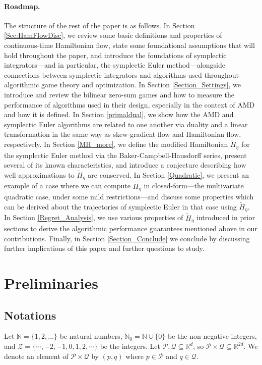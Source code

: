 \documentclass[11pt]{article}
\renewcommand{\P}{\mathcal{P}}
\newcommand{\R}{\mathbb{R}}
\newcommand{\Z}{\mathcal{Z}}
\newcommand{\N}{\mathbb{N}}
\newcommand{\Q}{\mathcal{Q}}
\begin{document}
\paragraph{Roadmap.}
The structure of the rest of the paper is as follows. In Section \ref{Sec:HamFlowDisc}, we review some basic definitions and properties of continuous-time Hamiltonian flow, state some foundational assumptions that will hold throughout the paper, and introduce the foundations of symplectic integrators---and in particular, the symplectic Euler method---alongside connections between symplectic integrators and algorithms used throughout algorithmic game theory and optimization. 
In Section \ref{Section_Settings}, we introduce and review the bilinear zero-sum games and how to measure the performance of algorithms used in their design, especially in the context of AMD and how it is defined. 
In Section \ref{primaldual}, we show how the AMD and symplectic Euler algorithms are related to one another via duality and a linear transformation in the same way as skew-gradient flow and Hamiltonian flow, respectively.  
In Section \ref{MH_more}, we define the modified Hamiltonian $\widetilde{H}_{\eta}$ for the symplectic Euler method via the Baker-Campbell-Hausdorff series, present several of its known characteristics, and introduce a conjecture describing how well approximations to $\widetilde{H}_{\eta}$ are conserved.
In Section \ref{Quadratic}, we present an example of a case where we can compute $\widetilde{H}_{\eta}$ in closed-form---the multivariate quadratic case, under some mild restrictions---and discuss some properties which can be derived about the trajectories of symplectic Euler in that case using $\widetilde{H}_{\eta}$. 
In Section \ref{Regret_Analysis}, we use various properties of $\widetilde{H}_{\eta}$ introduced in prior sections to derive the algorithmic performance guarantees mentioned above in our contributions. 
Finally, in Section \ref{Section_Conclude} we conclude by discussing further implications of this paper and further questions to study.

\section{Preliminaries}

\subsection{Notations}\label{note}
Let $\N = \{1,2,\dots\}$ be natural numbers, $\N_0 = \N \cup \{0\}$ be the non-negative integers, and $\Z = \{\cdots, -2, -1, 0, 1, 2, \cdots\}$ be the integers.
Let $\P, \Q \subseteq \R^d$, so $\P \times \Q \subseteq \R^{2d}$.
We denote an element of $\P \times \Q$ by $(p,q)$ where $p \in \P$ and $q \in \Q$.
\end{document}
